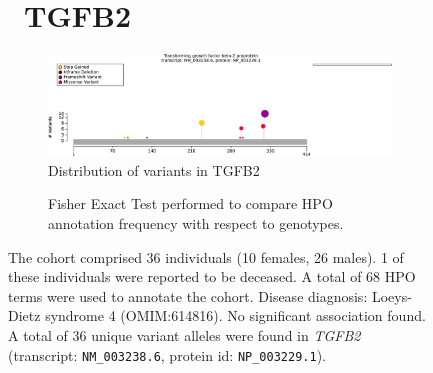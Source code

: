\begin{figure}[htbp]
\section*{ TGFB2}
\centering
\begin{subfigure}[b]{0.95\textwidth}
\centering
\includegraphics[width=\textwidth]{ img/TGFB2_protein_diagram.pdf} 
\captionsetup{justification=raggedright,singlelinecheck=false}
\caption{Distribution of variants in TGFB2}
\end{subfigure}

\vspace{2em}

\begin{subfigure}[b]{0.95\textwidth}
\centering
{}
\captionsetup{justification=raggedright,singlelinecheck=false}
\caption{Fisher Exact Test performed to compare HPO annotation frequency with respect to genotypes. }
\end{subfigure}

\vspace{2em}

\caption{ The cohort comprised 36 individuals (10 females, 26 males). 1 of these individuals were reported to be deceased. A total of 68 HPO terms were used to annotate the cohort. Disease diagnosis: Loeys-Dietz syndrome 4 (OMIM:614816). No significant association found. A total of 36 unique variant alleles were found in \textit{TGFB2} (transcript: \texttt{NM\_003238.6}, protein id: \texttt{NP\_003229.1}).}
\end{figure}
